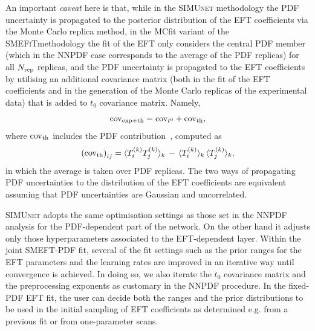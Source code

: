 \documentclass[withindex,glossary]{cam-thesis}
\newcommand{\simunet}{\textsc{SIMUnet}}
\newcommand{\smefit}{\textsc{SMEFiT}}
\begin{document}
 An important {\it caveat} here is that, while in the \simunet{}
 methodology the PDF uncertainty is propagated to the posterior
 distribution of the EFT coefficients via the Monte Carlo replica
 method, in the MCfit variant of the \smefit methodology the fit of
 the EFT only considers the central PDF member (which in the NNPDF
 case corresponds to the average of the PDF replicas) for all $N_{\rm rep}$
 replicas, and the PDF uncertainty is propagated to the EFT
 coefficients by utilising an additional covariance matrix (both in the fit of the EFT
 coefficients and in the generation of the Monte Carlo replicas of the
 experimental data) that is added to $t_0$ covariance matrix. Namely, 
 \begin{equation} \label{eq:expthcov}
{\rm cov}_{\rm exp+th} = {\rm cov}_{t^0} + {\rm cov}_{\rm th},
\end{equation}
where ${\rm cov}_{\rm th}$ 
includes the PDF contribution~\cite{Ethier:2021bye,Hartland:2019bjb}, computed as
\begin{equation}
\left( {\rm cov}_{\rm th}\right)_{ij} = \langle T_i^{(k)}T_j^{(k)}\rangle_k
\,-\, \langle T_i^{(k)}\rangle_k \, \langle T_j^{(k)}\rangle_k,
  \end{equation}
in which the average is taken over PDF replicas. The two ways of
propagating PDF uncertainties to the distribution of the EFT
coefficients are equivalent assuming that PDF uncertainties are Gaussian and uncorrelated. 
 
 \simunet{} adopts the same optimisation settings as those set in the
 NNPDF analysis for the PDF-dependent
 part of the network. On the other hand it adjusts only those hyperparameters
 associated to the EFT-dependent layer.
 Within the joint SMEFT-PDF fit, several of the fit settings
 such as the prior ranges for the EFT parameters and the learning rates are improved
 in an iterative way until convergence is achieved.
 In doing so, we also iterate the $t_0$ covariance matrix and the preprocessing
 exponents as customary in the NNPDF procedure.
 In the fixed-PDF EFT fit, the user can decide
 both the ranges and the prior distributions to be used in the initial
 sampling of EFT coefficients as determined e.g. from a previous
 fit or from one-parameter scans.
 
\end{document}
